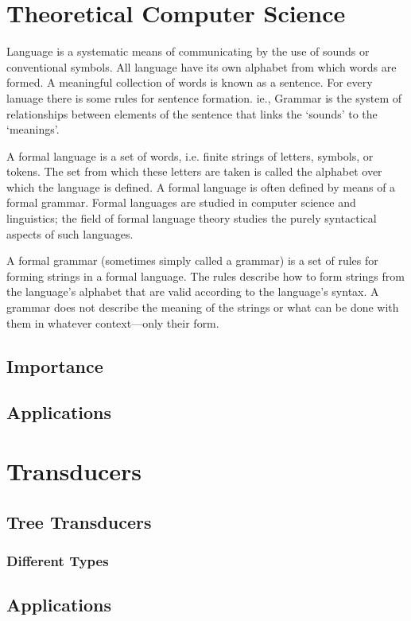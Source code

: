  \label{chap:intro}
 
\section{Theoretical Computer Science}
Language is a systematic means of communicating by the use of sounds or conventional symbols. All language have its own alphabet from which 
words are formed. A meaningful collection of words is known as a sentence. For every lanuage there is some rules for sentence formation. ie.,
Grammar is the system of relationships between elements of the sentence that links the ‘sounds’ to the ‘meanings’.

A formal language is a set of words, i.e. finite strings of letters, symbols, or tokens. The set from which these letters are taken is called the 
alphabet over which the language is defined. A formal language is often defined by means of a formal grammar.
Formal languages are studied in computer science and linguistics; the field of formal language theory studies the purely syntactical aspects 
of such languages.

A formal grammar (sometimes simply called a grammar) is a set of rules for forming strings in a formal language. The rules describe how to form strings from the language's alphabet that are valid according to the language's syntax. A grammar does not describe the meaning of the strings or what can be 
done with them in whatever context—only their form.

\subsection{Importance}
\subsection{Applications}
\section{Transducers}
\subsection{Tree Transducers}
\subsubsection{Different Types}
\subsection{Applications}

